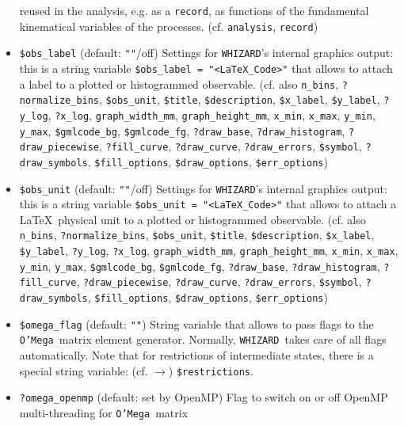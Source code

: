 \documentclass[12pt]{book}
\newcommand{\ttt}[1]{\texttt{#1}}
\newcommand{\whizard}{\texttt{WHIZARD}}
\newcommand{\oMega}{\texttt{O'Mega}}
\begin{document}
\begin{itemize}
reused in the analysis, e.g. as a \ttt{record}, as functions of the
fundamental kinematical variables of the processes. 
(cf. \ttt{analysis}, \ttt{record})
\item
\ttt{\$obs\_label} \qquad (default: \ttt{""}/off) \newline
Settings for \whizard's internal graphics output: this is a string variable
\ttt{\$obs\_label = "<LaTeX\_Code>"} that allows to attach a label to
a plotted or histogrammed observable. (cf. also 
\ttt{n\_bins}, \ttt{?normalize\_bins}, \ttt{\$obs\_unit},
\ttt{\$title}, \ttt{\$description}, \ttt{\$x\_label},
\ttt{\$y\_label}, \ttt{?y\_log}, \ttt{?x\_log},
\ttt{graph\_width\_mm}, \ttt{graph\_height\_mm}, 
\ttt{x\_min}, \ttt{x\_max}, \ttt{y\_min}, \ttt{y\_max},
\ttt{\$gmlcode\_bg}, \ttt{\$gmlcode\_fg}, \ttt{?draw\_base},
\ttt{?draw\_histogram}, \ttt{?draw\_piecewise}, \newline
\ttt{?fill\_curve}, \ttt{?draw\_curve}, \ttt{?draw\_errors}, \ttt{\$symbol}, 
\ttt{?draw\_symbols}, \ttt{\$fill\_options}, \ttt{\$draw\_options},
\ttt{\$err\_options})
\item
\ttt{\$obs\_unit} \qquad (default: \ttt{""}/off) \newline
Settings for \whizard's internal graphics output: this is a string variable
\ttt{\$obs\_unit = "<LaTeX\_Code>"} that allows to attach a \LaTeX\
physical unit to a plotted or histogrammed observable. (cf. also 
\ttt{n\_bins}, \ttt{?normalize\_bins}, \ttt{\$obs\_unit},
\ttt{\$title}, \ttt{\$description}, \ttt{\$x\_label},
\ttt{\$y\_label}, \ttt{?y\_log}, \ttt{?x\_log},
\ttt{graph\_width\_mm}, \ttt{graph\_height\_mm}, 
\ttt{x\_min}, \ttt{x\_max}, \ttt{y\_min}, \ttt{y\_max},
\ttt{\$gmlcode\_bg}, \ttt{\$gmlcode\_fg}, \ttt{?draw\_base},
\ttt{?draw\_histogram}, \ttt{?fill\_curve}, \ttt{?draw\_piecewise}, 
\ttt{?draw\_curve}, \ttt{?draw\_errors}, \ttt{\$symbol}, 
\ttt{?draw\_symbols}, \ttt{\$fill\_options}, \ttt{\$draw\_options},
\ttt{\$err\_options})
\item
\ttt{\$omega\_flag} \qquad (default: \ttt{""}) \newline
String variable that allows to pass flags to the \oMega\ matrix
element generator. Normally, \whizard\ takes care of all flags
automatically. Note that for restrictions of intermediate states,
there is a special string variable: (cf. $\to$) \ttt{\$restrictions}.
\item
\ttt{?omega\_openmp} \qquad (default: set by OpenMP) \newline
Flag to switch on or off OpenMP multi-threading for \oMega\ matrix

\end{itemize}
\end{document}
